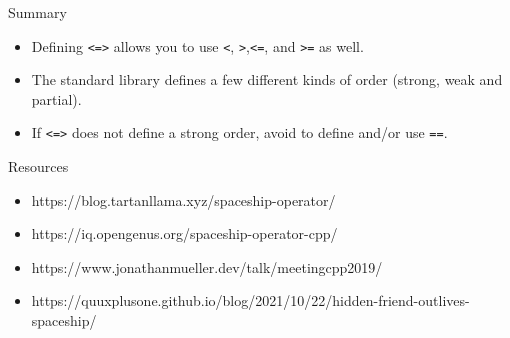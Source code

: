 \begin{frame}[fragile]
  \begin{alertblock}{Summary}
    \begin{itemize}
      \item Defining \texttt{<=>} allows you to use \texttt{<}, \texttt{>},\texttt{<=}, and \texttt{>=} as well.
      \item The standard library defines a few different kinds of order (strong, weak and partial).
      \item If \texttt{<=>} does not define a strong order, avoid to define and/or use \texttt{==}.
    \end{itemize}
  \end{alertblock}
  \begin{block}{Resources}
    \begin{itemize}
      \item https://blog.tartanllama.xyz/spaceship-operator/
      \item https://iq.opengenus.org/spaceship-operator-cpp/
      \item https://www.jonathanmueller.dev/talk/meetingcpp2019/
      \item https://quuxplusone.github.io/blog/2021/10/22/hidden-friend-outlives-spaceship/
    \end{itemize}
  \end{block}
\end{frame}
